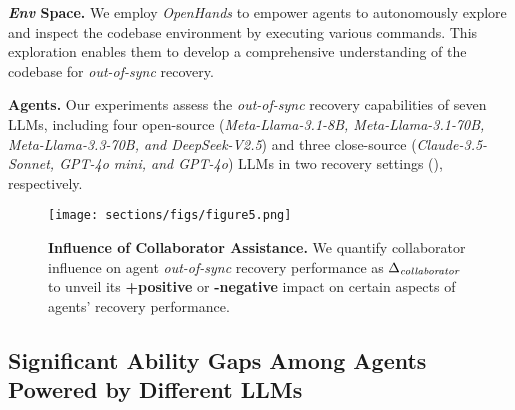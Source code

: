 \textbf{\textit{Env} Space.}
We employ \textit{OpenHands} \cite{OpenHands} to empower agents to autonomously explore and inspect the codebase environment by executing various commands.
This exploration enables them to develop a comprehensive understanding of the codebase for \textit{out-of-sync} recovery.

\textbf{Agents.} Our experiments assess the \textit{out-of-sync} recovery capabilities of seven LLMs, including four open-source (\textit{Meta-Llama-3.1-8B, Meta-Llama-3.1-70B,  Meta-Llama-3.3-70B, and DeepSeek-V2.5}) and three close-source (\textit{Claude-3.5-Sonnet, GPT-4o mini, and GPT-4o}) LLMs \cite{meta_llama_3.1_8B, meta_llama_3.1_70B, meta_llama_3.3_70B, deepseek_v2.5, claude_3.5_sonnet, gpt_4o, gpt_4o_mini} in two recovery settings (), respectively. 







\begin{figure}[H]
\begin{center}
\begin{small}
\texttt{[image: sections/figs/figure5.png]}
\vspace{-2em}
    \caption{\textbf{Influence of Collaborator Assistance.} We quantify collaborator influence on agent \textit{out-of-sync} recovery performance as $\Delta_{\textit{\text{collaborator}}}$ to unveil its \textcolor{fig5_green}{\textbf{+positive}} or \textcolor{fig5_red}{\textbf{-negative}} impact on certain aspects of agents' recovery performance.}
    \vspace{-1.2em}  %
    \label{fig:figure 5 (recovery performance and human influence)}
\end{small}
\end{center}
\end{figure}









\subsection{Significant Ability Gaps Among Agents Powered by Different LLMs}
\label{Section: Agent Recovery Capabilities}

